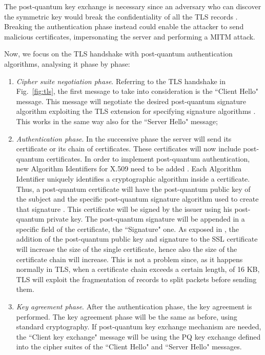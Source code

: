 \documentclass[a4paper,12pt]{article}
\def\myfig#1{Fig.~#1\xspace}
\begin{document}
The post-quantum key exchange is necessary since an adversary who can discover the symmetric key would break the confidentiality of all the TLS records \cite{10_postquantum_keyexchange}. Breaking the authentication phase instead could enable the attacker to send malicious certificates, impersonating the server and performing a MITM attack.

Now, we focus on the TLS handshake with post-quantum authentication algorithms, analysing it phase by phase:

\begin{enumerate}
    \item \textit{Cipher suite negotiation phase}. Referring to the TLS handshake in \myfig{\ref{fig:tls}}, the first message to take into consideration is the ``Client Hello" message. This message will negotiate the desired post-quantum signature algorithm exploiting the TLS extension for specifying signature algorithms \cite{5_postquantum_signature_usecase}. This works in the same way also for the ``Server Hello" message;
    \item \textit{Authentication phase}. In the successive phase the server will send its certificate or its chain of certificates. These certificates will now include post-quantum certificates.
    In order to implement post-quantum authentication, new Algorithm Identifiers for X.509 need to be added \cite{5_postquantum_signature_usecase}.
    Each Algorithm Identifier uniquely identifies a cryptographic algorithm inside a certificate.
    Thus, a post-quantum certificate will have the post-quantum public key of the subject and the specific post-quantum signature algorithm used to create that signature \cite{5_postquantum_signature_usecase}.
    This certificate will be signed by the issuer using his post-quantum private key. The post-quantum signature will be appended in a specific field of the certificate, the ``Signature" one.
    As exposed in \cite{5_postquantum_signature_usecase}, the addition of the post-quantum public key and signature to the SSL certificate will increase the size of the single certificate, hence also the size of the certificate chain will increase.
    This is not a problem since, as it happens normally in TLS, when a certificate chain exceeds a certain length, of 16 KB, TLS will exploit the fragmentation of records to split packets before sending them.
    \item \textit{Key agreement phase}. After the authentication phase, the key agreement is performed.
    The key agreement phase will be the same as before, using standard cryptography. If post-quantum key exchange mechanism are needed, the ``Client key exchange" message will be using the PQ key exchange defined into the cipher suites of the ``Client Hello" and ``Server Hello" messages.

\end{enumerate}
\end{document}

